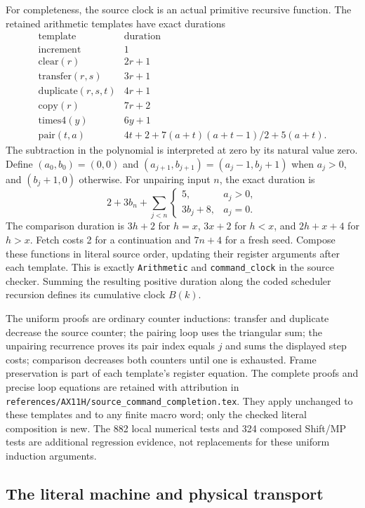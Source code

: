 For completeness, the source clock is an actual primitive recursive
function.  The retained arithmetic templates have exact durations
\[
\begin{array}{c|c}
 \mathrm{template}&\mathrm{duration}\\\hline
 \mathrm{increment}&1\\
 \mathrm{clear}(r)&2r+1\\
 \mathrm{transfer}(r,s)&3r+1\\
 \mathrm{duplicate}(r,s,t)&4r+1\\
 \mathrm{copy}(r)&7r+2\\
 \mathrm{times4}(y)&6y+1\\
 \mathrm{pair}(t,a)&4t+2+7(a+t)(a+t-1)/2+5(a+t).
\end{array}
\]
The subtraction in the polynomial is interpreted at zero by its natural
value zero.  Define $(a_0,b_0)=(0,0)$ and
$(a_{j+1},b_{j+1})=(a_j-1,b_j+1)$ when $a_j>0$, and
$(b_j+1,0)$ otherwise.  For unpairing input $n$, the exact duration is
\[
 2+3b_n+\sum_{j<n}
       \begin{cases}5,&a_j>0,\\3b_j+8,&a_j=0.\end{cases}
\]
The comparison duration is $3h+2$ for $h=x$, $3x+2$ for $h<x$,
and $2h+x+4$ for $h>x$.  Fetch costs 2 for a continuation and
$7n+4$ for a fresh seed.  Compose these functions in literal source
order, updating their register arguments after each template.  This is
exactly \texttt{Arithmetic} and \texttt{command\_clock} in the source
checker.  Summing the resulting positive duration along the coded
scheduler recursion defines its cumulative clock $B(k)$.

The uniform proofs are ordinary counter inductions: transfer and
duplicate decrease the source counter; the pairing loop uses the
triangular sum; the unpairing recurrence proves its pair index equals
$j$ and sums the displayed step costs; comparison decreases both
counters until one is exhausted.  Frame preservation is part of each
template's register equation.  The complete proofs and precise loop
equations are retained with attribution in
\texttt{references/AX11H/source\_command\_completion.tex}.
They apply unchanged to these templates and to any finite macro word;
only the checked literal composition is new.  The 882 local numerical
tests and 324 composed Shift/MP tests are additional regression evidence,
not replacements for these uniform induction arguments.

\subsection{The literal machine and physical transport}

